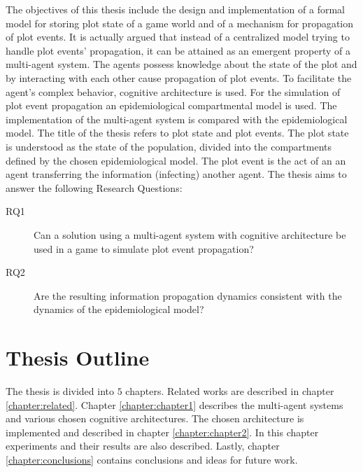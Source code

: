 The objectives of this thesis include the design and implementation of a formal model for storing plot state of a game world and of a mechanism for propagation of plot events.
It is actually argued that instead of a centralized model trying to handle plot events' propagation, it can be attained as an emergent property of a multi-agent system.
The agents possess knowledge about the state of the plot and by interacting with each other cause propagation of plot events.
To facilitate the agent's complex behavior, cognitive architecture is used.
For the simulation of plot event propagation an epidemiological compartmental model is used.
The implementation of the multi-agent system is compared with the epidemiological model.
The title of the thesis refers to plot state and plot events.
The plot state is understood as the state of the population, divided into the compartments defined by the chosen epidemiological model.
The plot event is the act of an an agent transferring the information (infecting) another agent.
The thesis aims to answer the following Research Questions:

\begin{description}
    \item[RQ1] Can a solution using a multi-agent system with cognitive architecture be used in a game to simulate plot event propagation?
    \item[RQ2] Are the resulting information propagation dynamics consistent with the dynamics of the epidemiological model?
\end{description}


\section*{Thesis Outline}

The thesis is divided into $5$ chapters.
Related works are described in chapter \ref{chapter:related}.
Chapter \ref{chapter:chapter1} describes the multi-agent systems and various chosen cognitive architectures.
The chosen architecture is implemented and described in chapter \ref{chapter:chapter2}.
In this chapter experiments and their results are also described.
Lastly, chapter \ref{chapter:conclusions} contains conclusions and ideas for future work.



